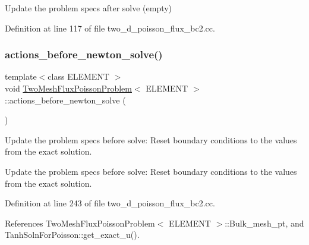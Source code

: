 Update the problem specs after solve (empty) 



Definition at line 117 of file two\+\_\+d\+\_\+poisson\+\_\+flux\+\_\+bc2.\+cc.

\mbox{\label{classTwoMeshFluxPoissonProblem_a520768a954d00d3972115ccf0b304854}} 
\subsubsection{\texorpdfstring{actions\+\_\+before\+\_\+newton\+\_\+solve()}{actions\_before\_newton\_solve()}}
{\footnotesize\ttfamily template$<$class E\+L\+E\+M\+E\+NT $>$ \\
void \hyperlink{classTwoMeshFluxPoissonProblem}{Two\+Mesh\+Flux\+Poisson\+Problem}$<$ E\+L\+E\+M\+E\+NT $>$\+::actions\+\_\+before\+\_\+newton\+\_\+solve (\begin{DoxyParamCaption}{ }\end{DoxyParamCaption})\hspace{0.3cm}{\ttfamily [private]}}



Update the problem specs before solve\+: Reset boundary conditions to the values from the exact solution. 

Update the problem specs before solve\+: Reset boundary conditions to the values from the exact solution. 

Definition at line 243 of file two\+\_\+d\+\_\+poisson\+\_\+flux\+\_\+bc2.\+cc.



References Two\+Mesh\+Flux\+Poisson\+Problem$<$ E\+L\+E\+M\+E\+N\+T $>$\+::\+Bulk\+\_\+mesh\+\_\+pt, and Tanh\+Soln\+For\+Poisson\+::get\+\_\+exact\+\_\+u().

\mbox{\label{classTwoMeshFluxPoissonProblem_a6729e6d9cf920e0880603fa9920ab28c}} 
